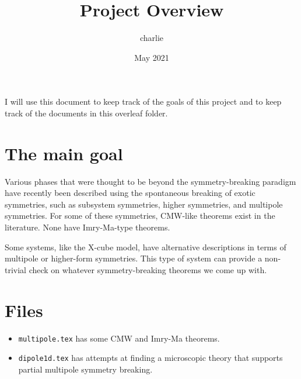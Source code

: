 \documentclass[12pt]{article}
\title{Project Overview}
\author{charlie}
\date{May 2021}
\begin{document}
\maketitle

I will use this document to keep track of the goals of this project and to keep track of the documents in this overleaf folder.

\section{The main goal}

Various phases that were thought to be beyond the symmetry-breaking paradigm have recently been described using the spontaneous breaking of exotic symmetries, such as subsystem symmetries, higher symmetries, and multipole symmetries. For some of these symmetries, CMW-like theorems exist in the literature. None have Imry-Ma-type theorems. 

Some systems, like the X-cube model, have alternative descriptions in terms of multipole or higher-form symmetries. This type of system can provide a non-trivial check on whatever symmetry-breaking theorems we come up with.

\section{Files}

\begin{itemize}
\item \texttt{multipole.tex} has some CMW and Imry-Ma theorems.
    
\item \texttt{dipole1d.tex} has attempts at finding a microscopic theory that supports partial multipole symmetry breaking.
\end{itemize}



\end{document}
